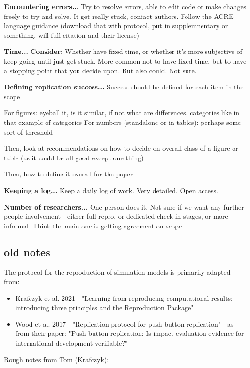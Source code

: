 \textbf{Encountering errors...}
Try to resolve errors, able to edit code or make changes freely to try and solve.
It get really stuck, contact authors. Follow the ACRE language guidance (download that with protocol, put in supplemnentary or something, will full citation and their license)

\textbf{Time...}
\textbf{Consider:} Whether have fixed time, or whether it's more subjective of keep going until just get stuck.
More common not to have fixed time, but to have a stopping point that you decide upon. But also could. Not sure.

\textbf{Defining replication success...}
Success should be defined for each item in the scope

For figures: eyeball it, is it similar, if not what are differences, categories like in that example of categories
For numbers (standalone or in tables): perhaps some sort of threshold

Then, look at recommendations on how to decide on overall class of a figure or table (as it could be all good except one thing)

Then, how to define it overall for the paper

\textbf{Keeping a log...}
Keep a daily log of work. Very detailed. Open access.

\textbf{Number of researchers...}
One person does it. Not sure if we want any further people involvement - either full repro, or dedicated check in stages, or more informal. Think the main one is getting agreement on scope.


\subsection{old notes}

The protocol for the reproduction of simulation models is primarily adapted from:
\begin{itemize}
    \item Krafczyk et al. 2021 - "Learning from reproducing computational results: introducing three principles and the Reproduction Package"\autocite{krafczyk_learning_2021}
    \item Wood et al. 2017 - "Replication protocol for push button replication"\autocite{wood_replication_2018} - as from their paper: "Push button replication: Is impact evaluation evidence for international development verifiable?"\autocite{wood_push_2018}
\end{itemize}

Rough notes from Tom (Krafczyk):

